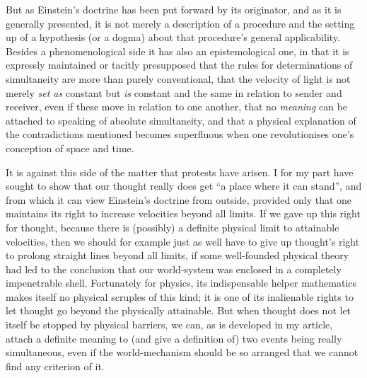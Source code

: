 \documentclass[12pt,a4paper]{article}
\begin{document}
But as Einstein's doctrine has been put forward by its originator, and as it
is generally presented, it is not merely a description of a procedure and the
setting up of a hypothesis (or a dogma) about that procedure's general
applicability. Besides a phenomenological side it has also an epistemological
one, in that it is expressly maintained or tacitly presupposed that the rules
for determinations of simultaneity are more than purely conventional, that the
velocity of light is not merely \emph{set as} constant but \emph{is} constant
and the same in relation to sender and receiver, even if these move in
relation to one another, that no \emph{meaning} can be attached to speaking of
absolute simultaneity, and that a physical explanation of the contradictions
mentioned becomes superfluous when one revolutionises one's conception of
space and time.

It is against this side of the matter that protests have arisen. I for my part
have sought to show that our thought really does get ``a place where it can
stand'', and from which it can view Einstein's doctrine from outside, provided
only that one maintains its right to increase velocities beyond all limits. If
we gave up this right for thought, because there is (possibly) a definite
physical limit to attainable velocities, then we should for example just as
well have to give up thought's right to
prolong straight lines beyond all limits, if some well-founded physical theory
had led to the conclusion that our world-system was enclosed in a completely
impenetrable shell. Fortunately for physics, its indispensable helper
mathematics makes itself no physical scruples of this kind; it is one of its
inalienable rights to let thought go beyond the physically attainable. But
when thought does not let itself be stopped by physical barriers, we can, as
is developed in my article, attach a definite meaning to (and give a
definition of) two events being really simultaneous, even if the
world-mechanism should be so arranged that we cannot find any criterion of it.
\end{document}
